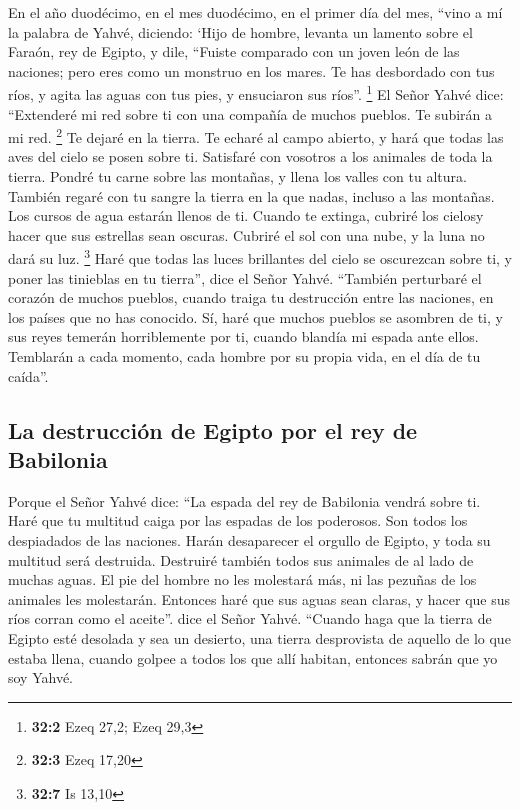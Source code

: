  En el año duodécimo, en el mes duodécimo, en el primer
día del mes, ``vino a mí la palabra de Yahvé, diciendo: 
`Hijo de hombre, levanta un lamento sobre el Faraón, rey de Egipto, y
dile, ``Fuiste comparado con un joven león de las naciones; pero eres
como un monstruo en los mares. Te has desbordado con tus ríos, y agita
las aguas con tus pies, y ensuciaron sus ríos''. \footnote{\textbf{32:2}
  Ezeq 27,2; Ezeq 29,3}  El Señor Yahvé dice: ``Extenderé
mi red sobre ti con una compañía de muchos pueblos. Te subirán a mi red.
\footnote{\textbf{32:3} Ezeq 17,20}  Te dejaré en la
tierra. Te echaré al campo abierto, y hará que todas las aves del cielo
se posen sobre ti. Satisfaré con vosotros a los animales de toda la
tierra.  Pondré tu carne sobre las montañas, y llena los
valles con tu altura.  También regaré con tu sangre la
tierra en la que nadas, incluso a las montañas. Los cursos de agua
estarán llenos de ti.  Cuando te extinga, cubriré los
cielosy hacer que sus estrellas sean oscuras. Cubriré el sol con una
nube, y la luna no dará su luz. \footnote{\textbf{32:7} Is 13,10}
 Haré que todas las luces brillantes del cielo se
oscurezcan sobre ti, y poner las tinieblas en tu tierra'', dice el Señor
Yahvé.  ``También perturbaré el corazón de muchos pueblos,
cuando traiga tu destrucción entre las naciones, en los países que no
has conocido.  Sí, haré que muchos pueblos se asombren de
ti, y sus reyes temerán horriblemente por ti, cuando blandía mi espada
ante ellos. Temblarán a cada momento, cada hombre por su propia vida, en
el día de tu caída''.

\hypertarget{la-destrucciuxf3n-de-egipto-por-el-rey-de-babilonia}{%
\subsection{La destrucción de Egipto por el rey de
Babilonia}\label{la-destrucciuxf3n-de-egipto-por-el-rey-de-babilonia}}

 Porque el Señor Yahvé dice: ``La espada del rey de
Babilonia vendrá sobre ti.  Haré que tu multitud caiga
por las espadas de los poderosos. Son todos los despiadados de las
naciones. Harán desaparecer el orgullo de Egipto, y toda su multitud
será destruida.  Destruiré también todos sus animales de
al lado de muchas aguas. El pie del hombre no les molestará más, ni las
pezuñas de los animales les molestarán.  Entonces haré
que sus aguas sean claras, y hacer que sus ríos corran como el aceite''.
dice el Señor Yahvé.  ``Cuando haga que la tierra de
Egipto esté desolada y sea un desierto, una tierra desprovista de
aquello de lo que estaba llena, cuando golpee a todos los que allí
habitan, entonces sabrán que yo soy Yahvé.

